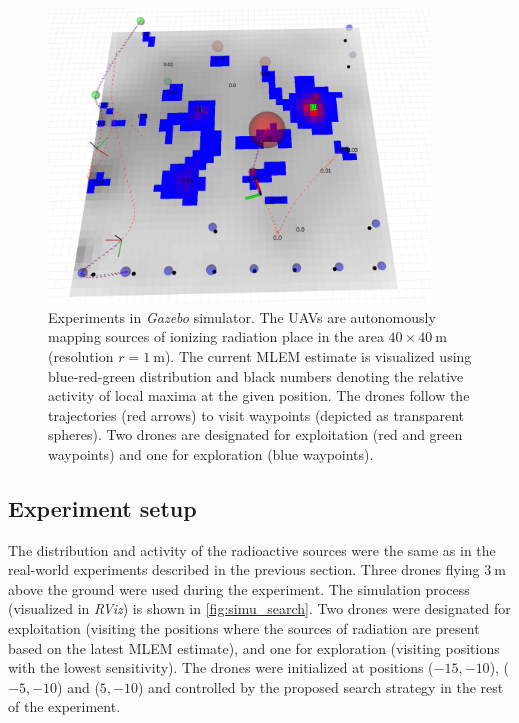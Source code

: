 \begin{figure}[!htb]
  \centering
    \includegraphics[width=0.9\textwidth]{./fig/photos/simu_search.png}
  \caption{Experiments in \textit{Gazebo} simulator. The \ac{UAV}s are autonomously mapping sources of ionizing radiation place in the area $40 \times 40\ \si{\meter}$ (resolution $r = \SI{1}{\meter}$). 
  The current \ac{MLEM} estimate is visualized using blue-red-green distribution and black numbers denoting the relative activity of local maxima at the given position. 
  The drones follow the trajectories (red arrows) to visit waypoints (depicted as transparent spheres). Two drones are designated for exploitation (red and green waypoints) and one for exploration (blue waypoints).}
  \label{fig:simu_search}
\end{figure}

\subsection{Experiment setup}
The distribution and activity of the radioactive sources were the same as in the real-world experiments described in the previous section.
Three drones flying $\SI{3}{\meter}$ above the ground were used during the experiment.  
The simulation process (visualized in \textit{RViz}) is shown in \autoref{fig:simu_search}.
Two drones were designated for exploitation (visiting the positions where the sources of radiation are present based on the latest \ac{MLEM} estimate), and one for exploration (visiting positions with the lowest sensitivity). 
The drones were initialized at positions ($-15, -10$), ($-5, -10$) and ($5, -10$) and controlled by the proposed search strategy in the rest of the experiment.
